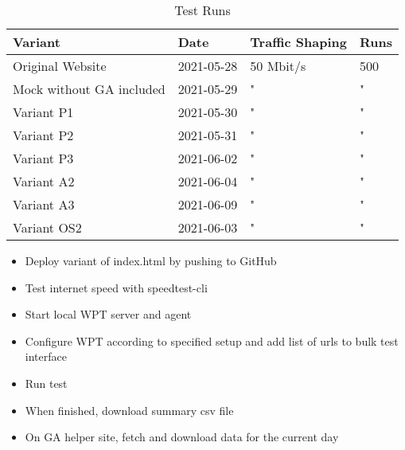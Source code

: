 


\begin{table}[h]
	\small
	\centering
	\begin{tabular}{ | l | l | l | l | } 
	 \hline
	  Variant \cellcolor{lightgrey} &  Date \cellcolor{lightgrey} & Traffic Shaping \cellcolor{lightgrey} & Runs \cellcolor{lightgrey} \\
	  \hline
	  Original Website & 2021-05-28 & 50 Mbit/s & 500 \\
	  Mock without GA included & 2021-05-29 & " & " \\
	  \hline
	  Variant P1 & 2021-05-30 & " & " \\
	  Variant P2 & 2021-05-31 & " & " \\
	  Variant P3 & 2021-06-02 & " & " \\
	  \hline
	  Variant A2 & 2021-06-04 & " & " \\
	  Variant A3 & 2021-06-09 & " & " \\
	  \hline
	  Variant OS2 & 2021-06-03 & " & " \\
	  \hline
	  \end{tabular}
	\medskip
	\caption{Test Runs}
	\label{table:test_runs}
\end{table}



\begin{itemize}
\item Deploy variant of index.html by pushing to GitHub
\item Test internet speed with speedtest-cli
\item Start local WPT server and agent
\item Configure WPT according to specified setup and add list of urls to bulk test interface
\item Run test
\item When finished, download summary csv file
\item On GA helper site, fetch and download data for the current day
\end{itemize}








